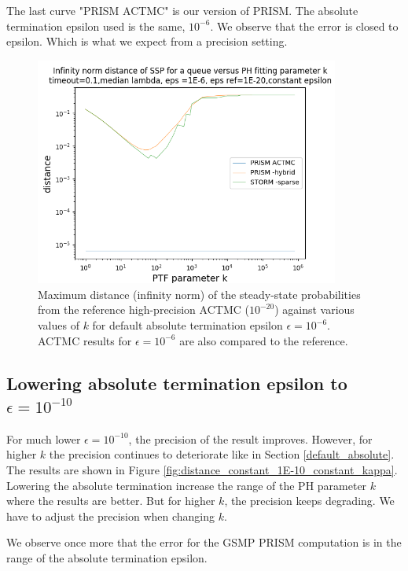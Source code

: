 \documentclass[runningheads,custombib]{llncs}
\begin{document}
	The last curve "PRISM ACTMC" is our version of PRISM. The absolute termination epsilon used is the same, $10^{-6}$. We observe that the error is closed to epsilon. Which is what we expect from a precision setting.
	
	\begin{figure}[H]
		\begin{center}
			\includegraphics[trim=0.3cm 0cm 0cm 1.35cm,width=10cm, clip]{../picture/New_model/1E-6/distance_constant_1E-6.png}
		\end{center}
		\caption{Maximum distance (infinity norm) of the steady-state probabilities from the reference high-precision ACTMC ($10^{-20}$) against various values of $k$ for default absolute termination epsilon $\epsilon = 10^{-6}$. ACTMC results for $\epsilon = 10^{-6}$ are also compared to the reference.}
		\label{fig:distance_constant_standard_constant_kappa}
	\end{figure}
	
	\subsection{Lowering absolute termination epsilon to $\epsilon = 10^{-10}$}
	\label{lowering}
	
	For much lower $\epsilon = 10^{-10}$, the precision of the result improves. However, for higher $k$ the precision continues to deteriorate like in Section \ref{default_absolute}. The results are shown in Figure \ref{fig:distance_constant_1E-10_constant_kappa}.
	Lowering the absolute termination increase the range of the PH parameter $k$ where the results are better. But for higher $k$, the precision keeps degrading. We have to adjust the precision when changing $k$. 
	
	We observe once more that the error for the GSMP PRISM computation is in the range of the absolute termination epsilon.
	
\end{document}

